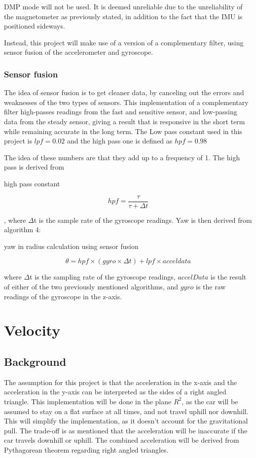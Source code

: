 \documentclass[12pt]{article}
\begin{document}
DMP mode will not be used. It is deemed unreliable due to the unreliability of the magnetometer as previously stated, in addition to the fact that the IMU is positioned sideways. 

Instead, this project will make use of a version of a complementary filter, using sensor fusion of the accelerometer and gyroscope. 

\subsubsection{Sensor fusion}
The idea of sensor fusion is to get cleaner data, by canceling out the errors and weaknesses of the two types of sensors.
This implementation of a complementary filter high-passes readings from the fast and sensitive sensor, and low-passing data from the steady sensor, giving a result that is responsive in the short term while remaining accurate in the long term. The Low pass constant used in this project is $lpf = 0.02$ and the high pass one is defined as $hpf = 0.98$

The idea of these numbers are that they add up to a frequency of 1. The high pass is derived from 
\begin{algorithm}                 
    \caption{high pass constant}    
		\[hpf = \frac{\tau}{\tau + \Delta t}\]
\end{algorithm}

, where $\Delta$t is the sample rate of the gyroscope readings. Yaw is then derived from algorithm 4:


\begin{algorithm}                 
    \caption{yaw in radius calculation using sensor fusion}    
		\[\theta = hpf\times (gyro\times \Delta t) + lpf\times acceldata\]
\end{algorithm}
where $\Delta$t is the sampling rate of the gyroscope readings, $accelData$ is the result of either of the two previously mentioned algorithms, and $gyro$ is the raw readings of the gyroscope in the z-axis. 

\section{Velocity}
\subsection{Background}

The assumption for this project is that the acceleration in the x-axis and the acceleration in the y-axis can be interpreted as the sides of a right angled triangle. This implementation will be done in the plane $R^2$, as the car will be assumed to stay on a flat surface at all times, and not travel uphill nor downhill. This will simplify the implementation, as it doesn't account for the gravitational pull. The trade-off is as mentioned that the acceleration will be inaccurate if the car travels downhill or uphill. The combined acceleration will be derived from Pythagorean theorem regarding right angled triangles.
\end{document}
